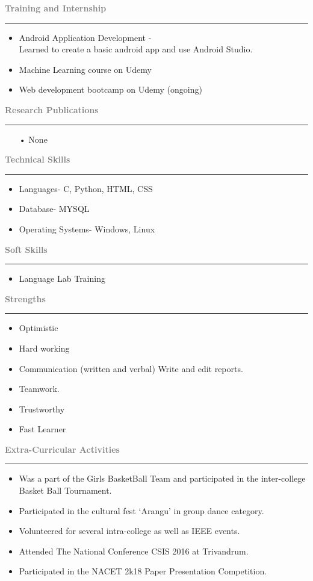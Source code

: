 \documentclass[11.5pt,a4paper]{article}
\begin{document}
\textbf{\textcolor{gray}{\huge Training and Internship}}\hrule
\begin{itemize}
\item Android Application Development -\\
Learned to create a basic android app and use Android Studio.
\item Machine Learning course on Udemy
\item Web development bootcamp on Udemy (ongoing)
\end{itemize}

\textbf{\textcolor{gray}{\huge Research Publications}}\\ \hrule
\begin{itemize}
\item[•]None
\end{itemize}


\textbf{\textcolor{gray}{\huge Technical Skills}}\\ \hrule
\begin{itemize}
\item Languages- C, Python, HTML, CSS
\item Database- MYSQL
\item Operating Systems- Windows, Linux
\end{itemize}

\textbf{\textcolor{gray}{\huge Soft Skills}}\\ \hrule
\begin{itemize}
\item Language Lab Training 
\end{itemize}

\textbf{\textcolor{gray}{\huge Strengths}}\\ \hrule
\begin{itemize}
\item Optimistic
\item Hard working
\item Communication (written and verbal) Write and edit reports.
\item Teamwork.
\item Trustworthy 
\item Fast Learner

\end{itemize}

\textbf{\textcolor{gray}{\huge Extra-Curricular Activities}}\\  \hrule
\begin{itemize}
\item Was a part of the Girls BasketBall Team and participated in the inter-college Basket Ball Tournament.
\item Participated in the cultural fest ‘Arangu’ in group dance category.
\item Volunteered for several intra-college as well as IEEE events.
\item Attended The National Conference CSIS  2016 at Trivandrum.
\item Participated in the NACET 2k18 Paper Presentation Competition.

\end{itemize}
\end{document}
